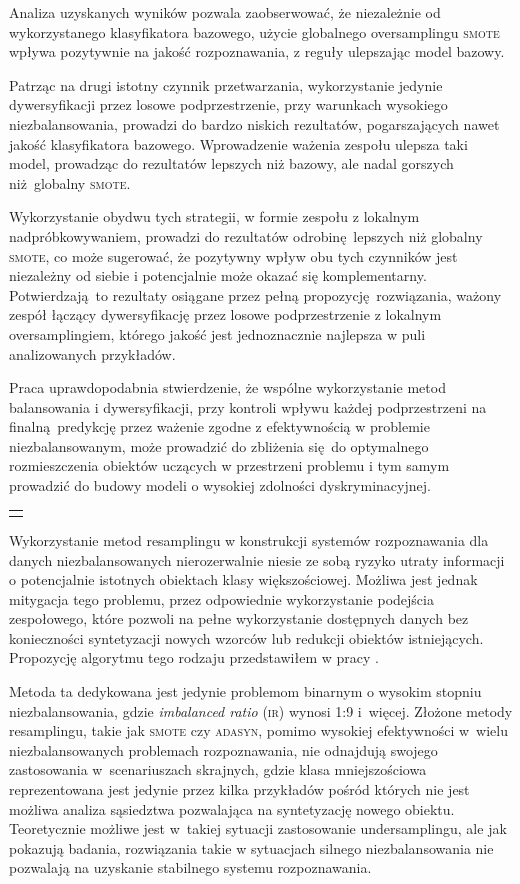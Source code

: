 Analiza uzyskanych wyników pozwala zaobserwować, że niezależnie od wykorzystanego klasyfikatora bazowego, użycie globalnego oversamplingu \textsc{smote} wpływa pozytywnie na jakość rozpoznawania, z reguły ulepszając model bazowy. 

Patrząc na drugi istotny czynnik przetwarzania, wykorzystanie jedynie dywersyfikacji przez losowe podprzestrzenie, przy warunkach wysokiego niezbalansowania, prowadzi do bardzo niskich rezultatów, pogarszających nawet jakość klasyfikatora bazowego. Wprowadzenie ważenia zespołu ulepsza taki model, prowadząc do rezultatów lepszych niż bazowy, ale nadal gorszych niż globalny \textsc{smote}.

Wykorzystanie obydwu tych strategii, w formie zespołu z lokalnym nadpróbkowywaniem, prowadzi do rezultatów odrobinę lepszych niż globalny \textsc{smote}, co może sugerować, że pozytywny wpływ obu tych czynników jest niezależny od siebie i potencjalnie może okazać się komplementarny. Potwierdzają to rezultaty osiągane przez pełną propozycję rozwiązania, ważony zespół łączący dywersyfikację przez losowe podprzestrzenie z lokalnym oversamplingiem, którego jakość jest jednoznacznie najlepsza w puli analizowanych przykładów.

Praca uprawdopodabnia stwierdzenie, że wspólne wykorzystanie metod balansowania i dywersyfikacji, przy kontroli wpływu każdej podprzestrzeni na finalną predykcję przez ważenie zgodne z efektywnością w problemie niezbalansowanym, może prowadzić do zbliżenia się do optymalnego rozmieszczenia obiektów uczących w przestrzeni problemu i tym samym prowadzić do budowy modeli o wysokiej zdolności dyskryminacyjnej.\vspace{1em}

\newpage
{
\color{red}
\noindent\begin{tabular}{p{\textwidth}}
	\toprule &
\end{tabular}\vspace{-1em}
}
\noindent Wykorzystanie metod resamplingu w konstrukcji systemów rozpoznawania dla danych niezbalansowanych nierozerwalnie niesie ze sobą ryzyko utraty informacji o potencjalnie istotnych obiektach klasy większościowej. Możliwa jest jednak mitygacja tego problemu, przez odpowiednie wykorzystanie podejścia zespołowego, które pozwoli na pełne wykorzystanie dostępnych danych bez konieczności syntetyzacji nowych wzorców lub redukcji obiektów istniejących. Propozycję algorytmu tego rodzaju przedstawiłem w pracy .

Metoda ta dedykowana jest jedynie problemom binarnym o wysokim stopniu niezbalansowania, gdzie \emph{imbalanced ratio} (\textsc{ir}) wynosi 1:9 i~więcej. Złożone metody resamplingu, takie jak \textsc{smote} czy \textsc{adasyn}, pomimo wysokiej efektywności w~wielu niezbalansowanych problemach rozpoznawania, nie odnajdują swojego zastosowania w~scenariuszach skrajnych, gdzie klasa mniejszościowa reprezentowana jest jedynie przez kilka przykładów pośród których nie jest możliwa analiza sąsiedztwa pozwalająca na syntetyzację nowego obiektu. Teoretycznie możliwe jest w~takiej sytuacji zastosowanie undersamplingu, ale jak pokazują badania, rozwiązania takie w sytuacjach silnego niezbalansowania nie pozwalają na uzyskanie stabilnego systemu rozpoznawania.


